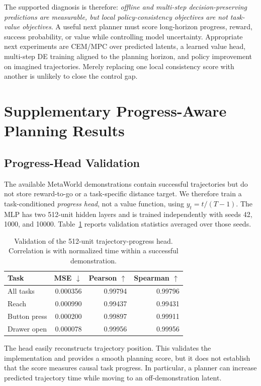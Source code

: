 \documentclass[10pt,twocolumn]{article}
\theoremstyle{tightstyle}
\begin{document}
The supported diagnosis is therefore: \emph{offline and multi-step
decision-preserving predictions are measurable, but local policy-consistency
objectives are not task-value objectives}. A useful next planner must score
long-horizon progress, reward, success probability, or value while controlling
model uncertainty. Appropriate next experiments are CEM/MPC over predicted
latents, a learned value head, multi-step DE training aligned to the planning
horizon, and policy improvement on imagined trajectories. Merely replacing one
local consistency score with another is unlikely to close the control gap.

\section{Supplementary Progress-Aware Planning Results}
\label{app:progress-planning}

\subsection{Progress-Head Validation}

The available MetaWorld demonstrations contain successful trajectories but do
not store reward-to-go or a task-specific distance target. We therefore train
a task-conditioned \emph{progress head}, not a value function, using
$y_t=t/(T-1)$. The MLP has two 512-unit hidden layers and is trained
independently with seeds 42, 1000, and 10000. Table~\ref{tab:progress-head-512}
reports validation statistics averaged over those seeds.

\begin{table}[t]
\centering
\caption{Validation of the 512-unit trajectory-progress head. Correlation is
with normalized time within a successful demonstration.}
\label{tab:progress-head-512}
\begin{tabular}{lrrr}
\toprule
\textbf{Task} & \textbf{MSE $\downarrow$} &
\textbf{Pearson $\uparrow$} & \textbf{Spearman $\uparrow$} \\
\midrule
All tasks & 0.000356 & 0.99794 & 0.99796 \\
Reach & 0.000990 & 0.99437 & 0.99431 \\
Button press & 0.000200 & 0.99897 & 0.99911 \\
Drawer open & 0.000078 & 0.99956 & 0.99956 \\
\bottomrule
\end{tabular}
\end{table}

The head easily reconstructs trajectory position. This validates the
implementation and provides a smooth planning score, but it does not establish
that the score measures causal task progress. In particular, a planner can
increase predicted trajectory time while moving to an off-demonstration
latent.
\end{document}
